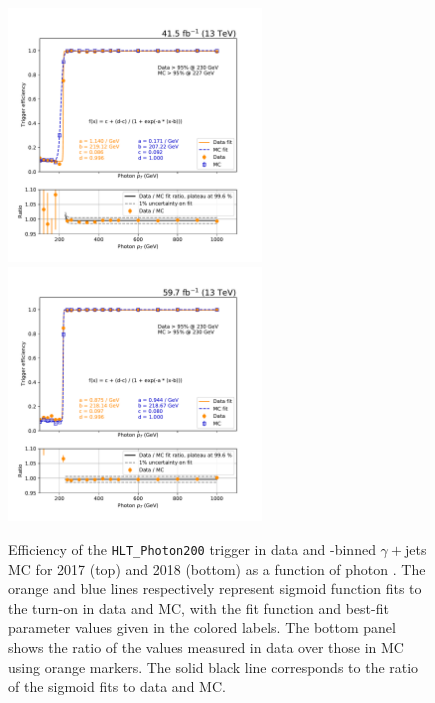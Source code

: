 \begin{figure}[hbtp]
    \begin{center}
        \includegraphics[width=0.6\textwidth]{Efficiency/Photon/fit_HLT_PFHT1050_2017.pdf}
        \includegraphics[width=0.6\textwidth]{Efficiency/Photon/fit_HLT_PFHT1050_2018.pdf}
        \caption{Efficiency of the \texttt{HLT\_Photon200} trigger in data and \HT-binned $\gamma+$jets MC for 2017 (top) and 2018 (bottom) 
        as a function of photon \pt. The orange and blue lines respectively represent sigmoid function fits to the turn-on in data and MC, 
        with the fit function and best-fit parameter values given in the colored labels. The bottom panel shows the ratio of the values measured 
        in data over those in MC using orange markers. The solid black line corresponds to the ratio of the sigmoid fits to data and MC.}
        \label{fig:hlteff_photon}
    \end{center}
\end{figure}

\clearpage

